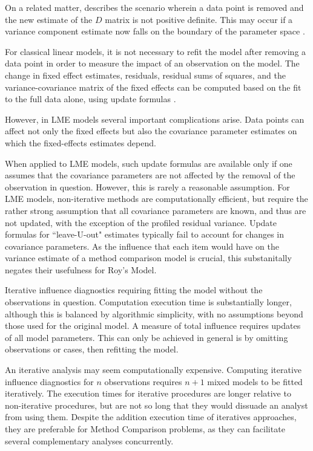 \documentclass[12pt, a4paper]{report}
\theoremstyle{plain}
\theoremstyle{definition}
\theoremstyle{remark}
\begin{document}
	On a related matter, \citet{schabenberger} describes the scenario wherein a data point is removed and the new estimate of the $D$ matrix is not positive definite. This may occur if a variance component
	estimate now falls on the boundary of the parameter space \citep{schabenberger}. 
	
	For classical linear models, it is not necessary to refit the model after removing a data point in order to measure the impact of an observation on the model. The change in fixed effect estimates, residuals, residual sums of squares, and the variance-covariance matrix of the fixed effects can be computed based on the fit to the full data alone, using update formulas \citep{sherman, hager1989}.
	
	
	
	However, in LME models several important complications arise. Data points can affect not only the fixed effects but also the covariance parameter estimates on which the fixed-effects estimates depend.
	
	When applied to LME models, such update formulas are available only if one assumes that the covariance parameters are not affected by the removal of the observation in question. However, this is rarely a reasonable assumption.
	For LME models, non-iterative methods are computationally efficient, but require the rather strong assumption that all 
	covariance parameters are known, and thus are not updated, with the exception of the profiled residual variance.
	Update formulas for ``leave-U-out" estimates typically fail to account for changes in covariance parameters.  As the influence that each item would have on the variance estimate of a method comparison model is crucial, this substanitally negates their usefulness for Roy's Model.
	
	Iterative influence diagnostics requiring fitting the model without the observations in question. Computation execution time is substantially longer, although this is balanced by algorithmic 
	simplicity, with no assumptions beyond those used for the original model. A measure of total influence requires updates of all model parameters. This can only be achieved in general is by omitting observations or cases, then refitting the model. 
	
	
	An iterative analysis may seem computationally expensive. Computing iterative influence diagnostics for $n$ observations
	requires $n+1$ mixed models to be fitted iteratively.
	The execution times for iterative procedures are longer relative to non-iterative procedures, but are not so long that they would dissuade an analyst from using them.
	Despite the addition execution time of iteratives
	approaches, they are preferable for Method Comparison problems, as they can facilitate several complementary analyses concurrently. 
	
\end{document}
